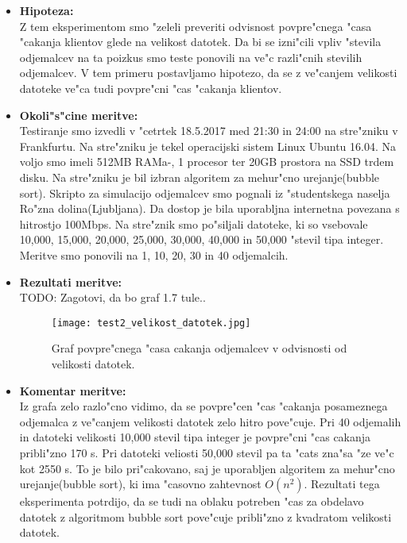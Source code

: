 \begin{itemize}
	\item \textbf{Hipoteza: }  \\
		Z tem eksperimentom smo "zeleli preveriti odvisnost povpre"cnega "casa "cakanja klientov glede na velikost datotek. Da bi se izni"cili vpliv "stevila odjemalcev na ta poizkus smo teste ponovili na ve"c razli"cnih stevilih odjemalcev.
V tem primeru postavljamo hipotezo, da se z ve"canjem velikosti datoteke ve"ca tudi povpre"cni "cas "cakanja klientov. 
			
	\item \textbf{Okoli"s"cine meritve: } \\
		Testiranje smo izvedli v "cetrtek 18.5.2017 med 21:30 in 24:00 na stre"zniku v Frankfurtu. Na stre"zniku je tekel operacijski sistem Linux Ubuntu 16.04. Na voljo smo imeli 512MB RAMa-, 1 procesor ter 20GB prostora na SSD trdem disku. Na stre"zniku je bil izbran algoritem za mehur"cno urejanje(bubble sort). Skripto za simulacijo odjemalcev smo pognali iz "studentskega naselja Ro"zna dolina(Ljubljana). Da dostop je bila uporabljna internetna povezana s hitrostjo 100Mbps. 
	 Na stre"znik smo po"siljali datoteke, ki so vsebovale 10,000, 15,000, 20,000, 25,000, 30,000, 40,000 in 50,000 "stevil tipa integer. Meritve smo ponovili na 1, 10, 20, 30 in 40 odjemalcih.  

 	\item \textbf{Rezultati meritve: }  \\
		TODO: Zagotovi, da bo graf 1.7 tule..
		\begin{figure}[!h]
  		\centering
  		  \texttt{[image: test2\_velikost\_datotek.jpg]}
  		\caption{Graf povpre"cnega "casa cakanja odjemalcev v odvisnosti od velikosti datotek.}		
  		\label{8_graf_st_odjemalcev}
		\end{figure}

	\item \textbf{Komentar meritve: } \\ 
		Iz grafa zelo razlo"cno vidimo, da se povpre"cen "cas "cakanja posameznega odjemalca z ve"canjem velikosti datotek zelo hitro pove"cuje. Pri 40 odjemalih in datoteki velikosti 10,000 stevil tipa integer je povpre"cni "cas cakanja pribli"zno 170 s. Pri datoteki veliosti 50,000 stevil pa ta "cats zna"sa "ze ve"c kot 2550 s. To je bilo pri"cakovano, saj je uporabljen algoritem za mehur"cno urejanje(bubble sort), ki ima "casovno zahtevnost  $O(n^2)$. Rezultati tega eksperimenta potrdijo, da se tudi na oblaku potreben "cas za obdelavo datotek z algoritmom bubble sort pove"cuje pribli"zno z kvadratom velikosti datotek. 
		


\end{itemize}

